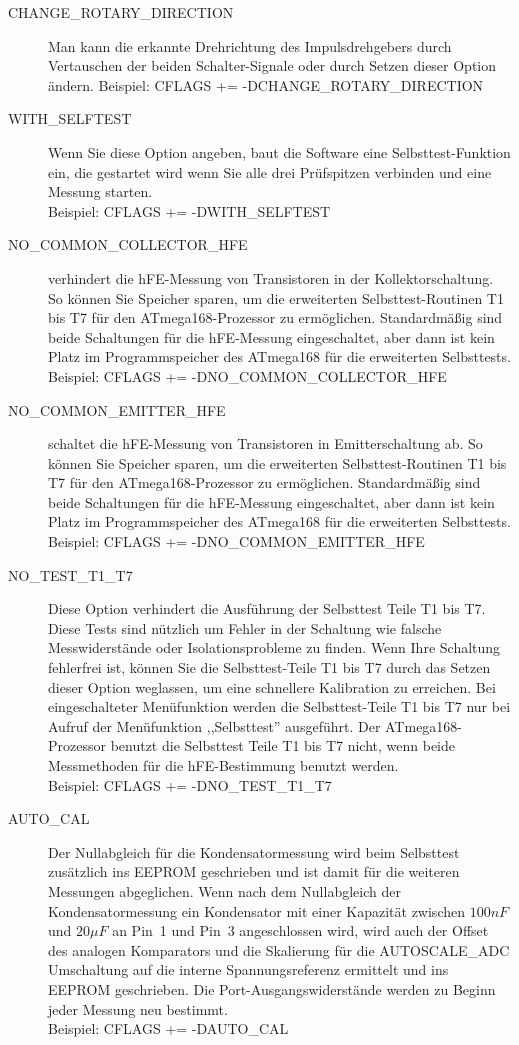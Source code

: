 \begin{description}
  \item[CHANGE\_ROTARY\_DIRECTION] Man kann die erkannte Drehrichtung des Impulsdrehgebers durch Vertauschen
der beiden Schalter-Signale oder durch Setzen dieser Option ändern.
Beispiel: CFLAGS += -DCHANGE\_ROTARY\_DIRECTION

 \item[WITH\_SELFTEST] Wenn Sie diese Option angeben, baut die Software eine Selbsttest-Funktion ein, die gestartet wird
wenn Sie alle drei Prüfspitzen verbinden und eine Messung starten.\\
Beispiel: CFLAGS += -DWITH\_SELFTEST

  \item[NO\_COMMON\_COLLECTOR\_HFE] verhindert die hFE-Messung von Transistoren in der Kollektorschaltung.
So können Sie Speicher sparen, um die erweiterten Selbsttest-Routinen T1 bis T7 für den ATmega168-Prozessor zu ermöglichen.
Standardmäßig sind beide Schaltungen für die hFE-Messung eingeschaltet,
aber dann ist kein Platz im Programmspeicher des ATmega168 für die erweiterten Selbsttests.\\
Beispiel: CFLAGS += -DNO\_COMMON\_COLLECTOR\_HFE

  \item[NO\_COMMON\_EMITTER\_HFE] schaltet die hFE-Messung von Transistoren in Emitterschaltung ab.
So können Sie Speicher sparen, um die erweiterten Selbsttest-Routinen T1 bis T7 für den ATmega168-Prozessor zu ermöglichen.
Standardmäßig sind beide Schaltungen für die hFE-Messung eingeschaltet,
aber dann ist kein Platz im Programmspeicher des ATmega168 für die erweiterten Selbsttests.\\
Beispiel: CFLAGS += -DNO\_COMMON\_EMITTER\_HFE

  \item[NO\_TEST\_T1\_T7] Diese Option verhindert die Ausführung der Selbsttest Teile T1 bis T7.
Diese Tests sind nützlich um Fehler in der Schaltung wie falsche Messwiderstände oder Isolationsprobleme zu finden.
Wenn Ihre Schaltung fehlerfrei ist, können Sie die Selbsttest-Teile T1 bis T7 durch das Setzen dieser Option weglassen, um eine
schnellere Kalibration zu erreichen.
Bei eingeschalteter Menüfunktion werden die Selbsttest-Teile T1 bis T7 nur bei Aufruf der Menüfunktion ,,Selbsttest'' ausgeführt.
Der ATmega168-Prozessor benutzt die Selbsttest Teile T1 bis T7 nicht, wenn beide Messmethoden für die hFE-Bestimmung benutzt werden.\\
Beispiel: CFLAGS += -DNO\_TEST\_T1\_T7

  \item[AUTO\_CAL] Der Nullabgleich für die Kondensatormessung wird beim
Selbsttest zusätzlich ins EEPROM geschrieben und ist damit für die weiteren Messungen abgeglichen.
Wenn nach dem Nullabgleich der Kondensatormessung ein Kondensator mit einer Kapazität zwischen \(100nF\) und \(20\mu F\) an Pin~1 und Pin~3 
angeschlossen wird, wird auch der Offset des analogen Komparators und die Skalierung für die AUTOSCALE\_ADC
Umschaltung auf die interne Spannungsreferenz ermittelt und ins EEPROM geschrieben.
Die Port-Ausgangswiderstände werden zu Beginn jeder Messung neu bestimmt. \\
Beispiel: CFLAGS += -DAUTO\_CAL


\end{description}
